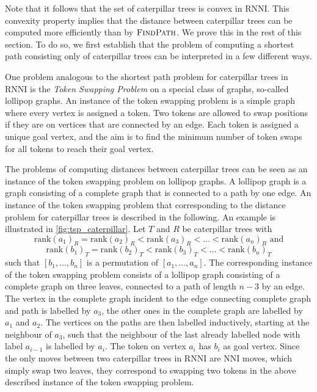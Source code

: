 \documentclass[11pt]{amsart}
\newcommand{\rnni}{\mathrm{RNNI}}
\newcommand{\findpath}{\textsc{FindPath}}
\newcommand{\rank}{\mathrm{rank}}
\newcommand{\nni}{\mathrm{NNI}}
\begin{document}
Note that it follows that the  set of caterpillar trees is convex in $\rnni$.
This convexity property implies that the distance between caterpillar trees can be computed more efficiently than by $\findpath$.
We prove this in the rest of this section.
To do so, we first establish that the problem of computing a shortest path consisting only of caterpillar trees can be interpreted in a few different ways.

One problem analogous to the shortest path problem for caterpillar trees in $\rnni$ is the \emph{Token Swapping Problem} \autocite{Kawahara2017-ey} on a special class of graphs, so-called lollipop graphs.
An instance of the token swapping problem is a simple graph where every vertex is assigned a token.
Two tokens are allowed to swap positions if they are on vertices that are connected by an edge.
Each token is assigned a unique goal vertex, and the aim is to find the minimum number of token swaps for all tokens to reach their goal vertex.

The problems of computing distances between caterpillar trees can be seen as an instance of the token swapping problem on lollipop graphs.
A lollipop graph is a graph consisting of a complete graph that is connected to a path by one edge.
An instance of the token swapping problem that corresponding to the distance problem for caterpillar trees is described in the following.
An example is illustrated in \autoref{fig:tsp_caterpillar}.
Let $T$ and $R$ be caterpillar trees with
\[\rank(a_1)_R = \rank(a_2)_R < \rank(a_3)_R < \ldots < \rank(a_n)_R \text{ and}\]
\[\rank(b_1)_T = \rank(b_2)_T < \rank(b_3)_T < \ldots < \rank(b_n)_T\]
such that $[b_1, \ldots, b_n]$ is a permutation of $[a_1, \ldots, a_n]$.
The corresponding instance of the token swapping problem consists of a lollipop graph consisting of a complete graph on three leaves, connected to a path of length $n-3$ by an edge.
The vertex in the complete graph incident to the edge connecting complete graph and path is labelled by $a_3$, the other ones in the complete graph are labelled by $a_1$ and $a_2$.
The vertices on the paths are then labelled inductively, starting at the neighbour of $a_3$, such that the neighbour of the last already labelled node with label $a_{i-1}$ is labelled by $a_i$.
The token on vertex $a_i$ has $b_i$ as goal vertex.
Since the only moves between two caterpillar trees in $\rnni$ are $\nni$ moves, which simply swap two leaves, they correspond to swapping two tokens in the above described instance of the token swapping problem.
\end{document}
